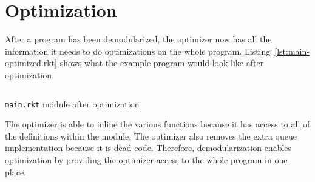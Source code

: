 \section{Optimization}

After a program has been demodularized, the optimizer now has all the information it needs to do optimizations on the whole program.
Listing~\ref{lst:main-optimized.rkt} shows what the example program would look like after optimization.

\begin{listing}
  \inputminted{racket}{listings/main-optimized.rkt}
  \caption{\texttt{main.rkt} module after optimization}
  \label{lst:main-optimized.rkt}
\end{listing}

The optimizer is able to inline the various functions because it has access to all of the definitions within the module.
The optimizer also removes the extra queue implementation because it is dead code.
Therefore, demodularization enables optimization by providing the optimizer access to the whole program in one place.
